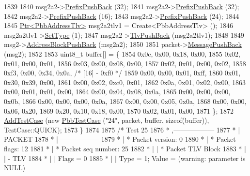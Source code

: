 \begin{DoxyCode}
1839 
1840     msg2a2->\hyperlink{classns3_1_1PbbAddressBlock_a8e6f539ccffd043a2890396d882d0a42}{PrefixPushBack} (32);
1841     msg2a2->\hyperlink{classns3_1_1PbbAddressBlock_a8e6f539ccffd043a2890396d882d0a42}{PrefixPushBack} (32);
1842     msg2a2->\hyperlink{classns3_1_1PbbAddressBlock_a8e6f539ccffd043a2890396d882d0a42}{PrefixPushBack} (16);
1843     msg2a2->\hyperlink{classns3_1_1PbbAddressBlock_a8e6f539ccffd043a2890396d882d0a42}{PrefixPushBack} (24);
1844 
1845     \hyperlink{classns3_1_1Ptr}{Ptr<PbbAddressTlv>} msg2a2tlv1 = Create<PbbAddressTlv> ();
1846     msg2a2tlv1->\hyperlink{classns3_1_1PbbTlv_a90a0452018ed364ac37c3ad116dd718b}{SetType} (1);
1847     msg2a2->\hyperlink{classns3_1_1PbbAddressBlock_a6e33cd1452dd3ff753de3e3c99e473a5}{TlvPushBack} (msg2a2tlv1);
1848 
1849     msg2->\hyperlink{classns3_1_1PbbMessage_a5f623bad2fb1adde7da885e1c92d5311}{AddressBlockPushBack} (msg2a2);
1850 
1851     packet->\hyperlink{classns3_1_1PbbPacket_a4a3170001ef758d9c9c4375b8f089826}{MessagePushBack} (msg2);
1852 
1853     uint8\_t buffer[] = \{
1854       0x0c, 0x00, 0x18, 0x00,
1855       0x02, 0x01, 0x00, 0x01,
1856       0x03, 0x00, 0x08, 0x00,
1857       0x02, 0x01, 0x00, 0x02,
1858       0xf3, 0x00, 0x34, 0x0a,   \textcolor{comment}{/* [16] - 0xf0 */}
1859       0x00, 0x00, 0x01, 0xff,
1860       0x01, 0x30, 0x39, 0x00,
1861       0x00, 0x02, 0xc0, 0x01,
1862       0x0a, 0x01, 0x02, 0x00,
1863       0x00, 0x01, 0x01, 0x00,
1864       0x00, 0x04, 0x08, 0x0a,
1865       0x00, 0x00, 0x00, 0x0b,
1866       0x00, 0x00, 0x00, 0x0a,
1867       0x00, 0x00, 0x05, 0x0a,
1868       0x00, 0x00, 0x06, 0x20,
1869       0x20, 0x10, 0x18, 0x00,
1870       0x02, 0x01, 0x00,
1871     \};
1872     \hyperlink{classns3_1_1TestCase_a3718088e3eefd5d6454569d2e0ddd835}{AddTestCase} (\textcolor{keyword}{new} \hyperlink{classPbbTestCase}{PbbTestCase} (\textcolor{stringliteral}{"24"}, packet, buffer, \textcolor{keyword}{sizeof}(buffer)), 
      TestCase::QUICK);
1873   \}
1874 
1875   \textcolor{comment}{/* Test 25}
1876 \textcolor{comment}{         * ,------------------}
1877 \textcolor{comment}{         * |  PACKET}
1878 \textcolor{comment}{         * |------------------}
1879 \textcolor{comment}{         * | * Packet version:    0}
1880 \textcolor{comment}{         * | * Packet flags:  12}
1881 \textcolor{comment}{         * | * Packet seq number: 25}
1882 \textcolor{comment}{         * |    | * Packet TLV Block}
1883 \textcolor{comment}{         * |    |     - TLV}
1884 \textcolor{comment}{         * |    |         Flags = 0}
1885 \textcolor{comment}{         * |    |         Type = 1; Value = (warning: parameter is NULL)}

\end{DoxyCode}
